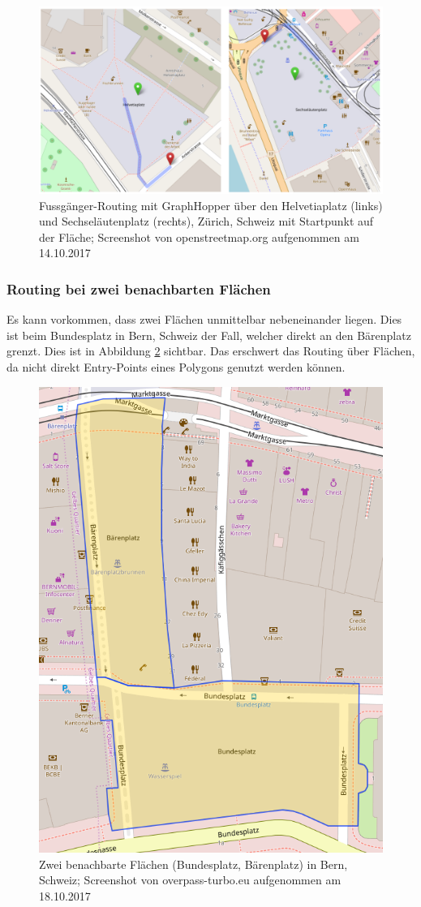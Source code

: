 \begin{figure}[ht]
    \centering
    \includegraphics[width=1\linewidth]{technicalreport/img/start_endpoint_on_area}
    \caption[Fussgänger-Routing mit Startpunkt auf der Fläche]{Fussgänger-Routing mit GraphHopper über den Helvetiaplatz (links) und Sechseläutenplatz (rechts), Zürich, Schweiz mit Startpunkt auf der Fläche; Screenshot von openstreetmap.org aufgenommen am 14.10.2017}
    \label{fig:start_endpoint_on_area}
\end{figure}

\subsubsection{Routing bei zwei benachbarten Flächen}
\label{problem:Routing bei zwei benachbarten Flächen}
Es kann vorkommen, dass zwei Flächen unmittelbar nebeneinander liegen. Dies ist beim Bundesplatz in Bern, Schweiz der Fall, welcher direkt an den Bärenplatz grenzt. Dies ist in Abbildung \ref{fig:bundesplatz_baerenplatz} sichtbar. Das erschwert das Routing über Flächen, da nicht direkt Entry-Points eines Polygons genutzt werden können.

\begin{figure}[ht]
\centering
\includegraphics[width=0.5\linewidth]{technicalreport/img/bundesplatz_baerenplatz}
\caption[Zwei benachbarte Flächen]{Zwei benachbarte Flächen (Bundesplatz, Bärenplatz) in Bern, Schweiz; Screenshot von overpass-turbo.eu aufgenommen am 18.10.2017}
\label{fig:bundesplatz_baerenplatz}
\end{figure}

